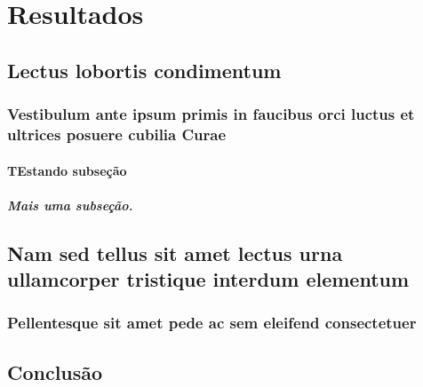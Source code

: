 \documentclass[
	12pt,				%
	openright,			%
    twoside,			%
	a4paper,			%
	english,			%
	french,				%
	spanish,			%
	brazil				%
	]{abntex2}
\numberwithin{lema}{chapter}
\numberwithin{teorema}{chapter}
\numberwithin{definicao}{chapter}
\numberwithin{exemplo}{chapter}
\numberwithin{figure}{chapter}
\begin{document}
\part{Resultados}

\chapter{Lectus lobortis condimentum}

\section{Vestibulum ante ipsum primis in faucibus orci luctus et ultrices
posuere cubilia Curae}

\lipsum[21-22]

\subsection{TEstando subseção}

\subsubsection{Mais uma subseção.}



\chapter{Nam sed tellus sit amet lectus urna ullamcorper tristique interdum
elementum}

\section{Pellentesque sit amet pede ac sem eleifend consectetuer}

\lipsum[24]


\chapter{Conclusão}
\end{document}
